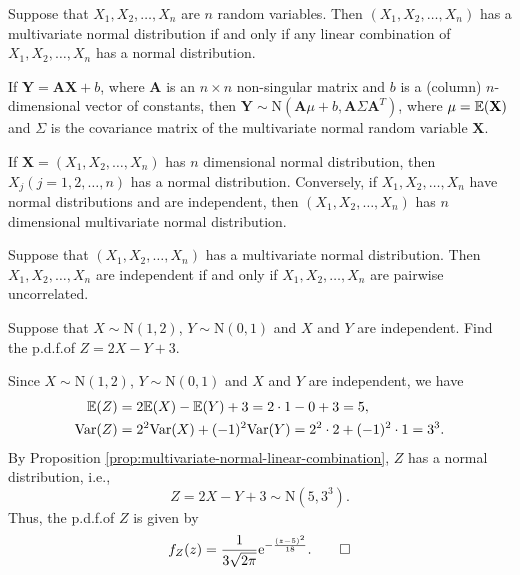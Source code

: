 \begin{proposition}\label{prop:multivariate-normal-linear-combination}
  Suppose that \(X_1, X_2, \dots, X_n\) are \(n\) random variables. Then \((X_1, X_2, \dots, X_n)\) has a multivariate normal distribution if and only if any linear combination of \(X_1, X_2, \dots, X_n\) has a normal distribution.
\end{proposition}

\begin{proposition}\label{prop:multivariate-normal-linear-transformation}
  If \(\mathbf{Y} = \mathbf{A}\mathbf{X} + b\), where \(\mathbf{A}\) is an \(n \times n\) non-singular matrix and \(b\) is a (column) \(n\)-dimensional vector of constants, then \(\mathbf{Y} \sim \mathrm{N}(\mathbf{A}\mu + b, \mathbf{A} \Sigma \mathbf{A}^T)\), where \(\mu = \mathbb{E}(\mathbf{X})\) and \(\Sigma\) is the covariance matrix of the multivariate normal random variable \(\mathbf{X}\).
\end{proposition}

\begin{proposition}
  If \(\mathbf{X} = (X_1, X_2, \dots, X_n)\) has \(n\) dimensional normal distribution, then \(X_j (j = 1, 2, \dots, n)\) has a normal distribution. Conversely, if \(X_1, X_2, \dots, X_n\) have normal distributions and are independent, then \((X_1, X_2, \dots, X_n)\) has \(n\) dimensional multivariate normal distribution.
\end{proposition}

\begin{proposition}
  Suppose that \((X_1, X_2, \dots, X_n)\) has a multivariate normal distribution. Then \(X_1, X_2, \dots, X_n\) are independent if and only if \(X_1, X_2, \dots, X_n\) are pairwise uncorrelated.
\end{proposition}

\begin{example}
  Suppose that \(X \sim \mathrm{N}(1, 2)\), \(Y \sim \mathrm{N}(0, 1)\) and \(X\) and \(Y\) are independent. Find the p.d.f.\@ of \(Z = 2X - Y + 3\).
\end{example}
\begin{solution}
  Since \(X \sim \mathrm{N}(1, 2)\), \(Y \sim \mathrm{N}(0, 1)\) and \(X\) and \(Y\) are independent, we have
  \begin{align*}
    \mathbb{E}(Z) &= 2 \mathbb{E}(X) - \mathbb{E}(Y) + 3 = 2 \cdot 1 - 0 + 3 = 5, \\
    \mathrm{Var}(Z) &= 2^2 \mathrm{Var}(X) + (-1)^2 \mathrm{Var}(Y) = 2^2 \cdot 2 + (-1)^2 \cdot 1 = 3^3.
  \end{align*}
  By Proposition \ref{prop:multivariate-normal-linear-combination}, \(Z\) has a normal distribution, i.e.,
  \[
    Z = 2X - Y + 3 \sim \mathrm{N}(5, 3^3).
  \]
  Thus, the p.d.f.\@ of \(Z\) is given by
  \[
    f_Z(z) = \frac{1}{3\sqrt{2 \mathrm{\pi}}} \mathrm{e}^{-\frac{(z - 5)^2}{18}}. \qedhere
  \]
\end{solution}

